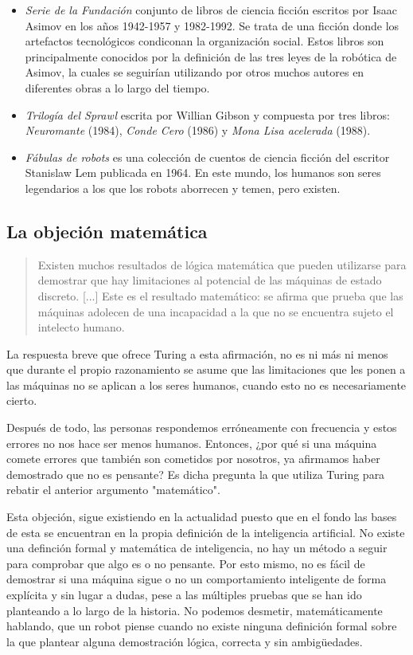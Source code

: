 \documentclass[12pt,a4paper]{article}
\begin{document}
\begin{itemize}
\item \emph{Serie de la Fundación} conjunto de libros de ciencia ficción escritos por Isaac Asimov en los años 1942-1957 y 1982-1992. Se trata de una ficción donde los artefactos tecnológicos condiconan la organización social. Estos libros son principalmente conocidos por la definición de las tres leyes de la robótica de Asimov, la cuales se seguirían utilizando por otros muchos autores en diferentes obras a lo largo del tiempo.
\item \emph{Trilogía del Sprawl} escrita por Willian Gibson y compuesta por tres libros: \emph{Neuromante} (1984),\emph{ Conde Cero} (1986) y \emph{Mona Lisa acelerada} (1988).
\item \emph{Fábulas de robots} es una colección de cuentos de ciencia ficción del escritor Stanislaw Lem publicada en 1964. En este mundo, los humanos son seres legendarios a los que los robots aborrecen y temen, pero existen.
\end{itemize}

\subsection{La objeción matemática}
\begin{quote}\small Existen muchos resultados de lógica matemática que pueden utilizarse para demostrar que hay limitaciones al potencial de las máquinas de estado discreto. [...] Este es el resultado matemático: se afirma que prueba que las máquinas adolecen de una incapacidad a la que no se encuentra sujeto el intelecto humano.\end{quote}

La respuesta breve que ofrece Turing a esta afirmación, no es ni más ni menos que durante el propio razonamiento se asume que las limitaciones que les ponen a las máquinas no se aplican a los seres humanos, cuando esto no es necesariamente cierto.

Después de todo, las personas respondemos erróneamente con frecuencia y estos errores no nos hace ser menos humanos. Entonces, ¿por qué si una máquina comete errores que también son cometidos por nosotros, ya afirmamos haber demostrado que no es pensante? Es dicha pregunta la que utiliza Turing para rebatir el anterior argumento "matemático".

Esta objeción, sigue existiendo en la actualidad puesto que en el fondo las bases de esta se encuentran en la propia definición de la inteligencia artificial. No existe una definción formal y matemática de inteligencia, no hay un método a seguir para comprobar que algo es o no pensante. Por esto mismo, no es fácil de demostrar si una máquina sigue o no un comportamiento inteligente de forma explícita y sin lugar a dudas, pese a las múltiples pruebas que se han ido planteando a lo largo de la historia. No podemos desmetir, matemáticamente hablando, que un robot piense cuando no existe ninguna definición formal sobre la que plantear alguna demostración lógica, correcta y sin ambigüedades.
\end{document}

